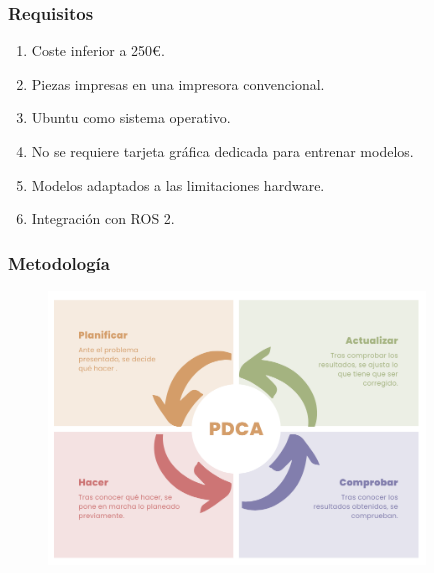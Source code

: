 \documentclass{beamer}
\begin{document}
\begin{frame}
\frametitle{Requisitos}

\begin{enumerate}
	\item Coste inferior a 250€.
	\item Piezas impresas en una impresora convencional.
	\item Ubuntu como sistema operativo.
	\item No se requiere tarjeta gráfica dedicada para entrenar modelos.
	\item Modelos adaptados a las limitaciones hardware.
	\item Integración con ROS 2.
\end{enumerate}
\end{frame}

\begin{frame}
	\frametitle{Metodología}
	\begin{figure}
		\centering
		\includegraphics[width=10cm]{figs/PDCA.png}
	\end{figure}
	
\end{frame}
\end{document}
